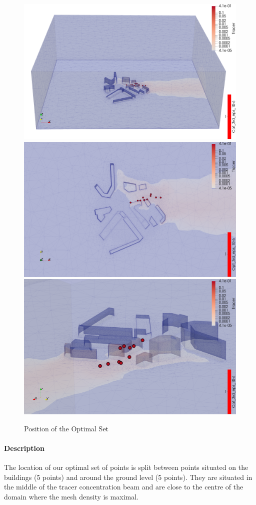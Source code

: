 \begin{figure}[h!]
\centering
\includegraphics[width=0.7\linewidth]{figures/MainOptimResults/alg3opteps10-6_sideall_screenshot}
\smallbreak
\includegraphics[width=0.7\linewidth]{figures/MainOptimResults/alg3opteps10-6_top_screenshot}
\smallbreak
\includegraphics[width=0.7\linewidth]{figures/MainOptimResults/alg3opteps10-6_zoom_screenshot}
\caption{Position of the Optimal Set}
\label{fig:full_set:position:zoom}
\end{figure}


\paragraph{Description}

The location of our optimal set of points is split between points situated on the buildings (5 points) and around the ground level (5 points). They are situated in the middle of the tracer concentration beam and are close to the centre of the domain where the mesh density is maximal. \\ 


